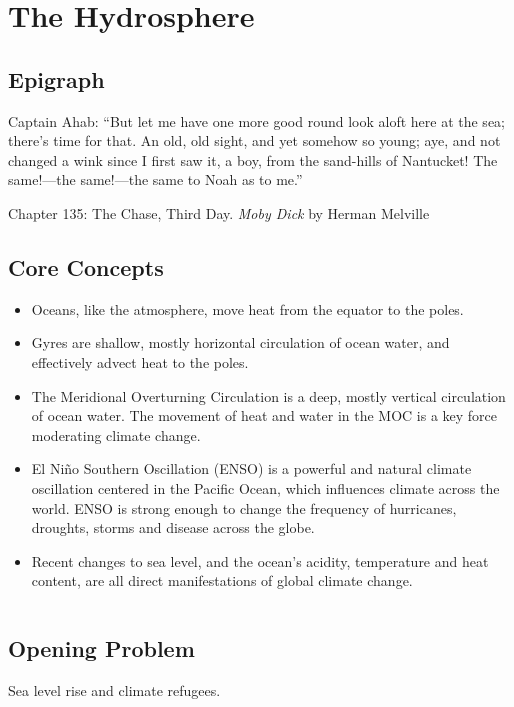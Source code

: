 \chapter{The Hydrosphere}\label{Hydrosphere}
\section{Epigraph} \label{Hydrosphere_Epigraph}
\epigraph{Captain Ahab: ``But let me have one more good round look aloft here at the sea; there's time for that. An old, old sight, and yet somehow so young; aye, and not changed a wink since I first saw it, a boy, from the sand-hills of Nantucket! The same!---the same!---the same to Noah as to me.''}{Chapter 135: The Chase, Third Day. \textit{Moby Dick} by Herman Melville } 

\section{Core Concepts} \label{Hydrosphere_Core Concepts}
\begin{itemize}
	\item	Oceans, like the atmosphere, move heat from the equator to the poles.
	\item	Gyres are shallow, mostly horizontal circulation of ocean water, and effectively advect heat to the poles.
	\item The Meridional Overturning Circulation is a deep, mostly vertical circulation of ocean water. The movement of heat and water in the MOC is a key force moderating climate change.
	\item	El Ni\~no Southern Oscillation (ENSO) is a powerful and natural climate oscillation centered in the Pacific Ocean, which influences climate across the world. ENSO is strong enough to change the frequency of hurricanes, droughts, storms and disease across the globe.    
	\item	Recent changes to sea level, and the ocean's acidity, temperature and heat content, are all direct manifestations of global climate change. 
\end{itemize}
$\ $\\

\section{Opening Problem} \label{Hydrosphere_Opening Problem}
Sea level rise and climate refugees. 
$\ $\\


